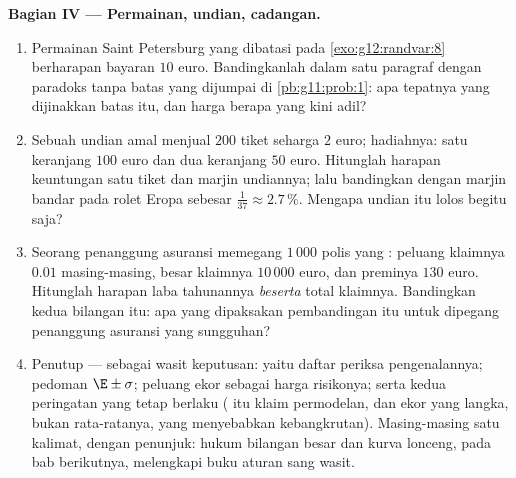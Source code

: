 \begin{problem}
\medskip
\noindent\textbf{Bagian IV --- Permainan, undian, cadangan.}
\begin{enumerate}[resume]
  \item Permainan Saint Petersburg yang dibatasi pada
        \cref{exo:g12:randvar:8} berharapan bayaran $10$
        euro. Bandingkanlah dalam satu paragraf dengan paradoks tanpa
        batas yang dijumpai di \cref{pb:g11:prob:1}: apa tepatnya yang
        dijinakkan batas itu, dan harga berapa yang kini adil?
  \item Sebuah undian amal menjual $200$ tiket seharga $2$ euro;
        hadiahnya: satu keranjang $100$ euro dan dua keranjang $50$ euro.
        Hitunglah harapan keuntungan satu tiket dan marjin undiannya;
        lalu bandingkan dengan marjin bandar pada rolet Eropa
        sebesar $\frac{1}{37} \approx 2.7\,\%$. Mengapa undian itu
        lolos begitu saja?
  \item Seorang penanggung asuransi memegang $1\,000$ polis yang : peluang
        klaimnya $0.01$ masing-masing, besar klaimnya $10\,000$ euro, dan
        preminya $130$ euro. Hitunglah harapan laba tahunannya
        \emph{beserta}  total
        klaimnya. Bandingkan kedua bilangan itu: apa yang dipaksakan
        pembandingan itu untuk dipegang penanggung asuransi yang sungguhan?
  \item Penutup ---  sebagai wasit keputusan: yaitu
        daftar periksa pengenalannya; pedoman $\E \pm \sigma$;
        peluang ekor sebagai harga risikonya; serta kedua peringatan
        yang tetap berlaku ( itu klaim permodelan, dan
        ekor yang langka, bukan rata-ratanya, yang menyebabkan kebangkrutan). Masing-masing satu kalimat,
        dengan penunjuk: hukum bilangan besar dan kurva
        lonceng, pada bab berikutnya, melengkapi buku aturan sang wasit.

\end{enumerate}
\end{problem}
